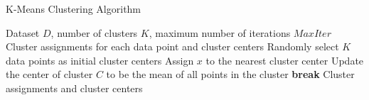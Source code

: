 \documentclass{article}
\begin{document}
	
	\begin{algorithm}
		\caption{K-Means Clustering Algorithm}
		\begin{algorithmic}[1]
			\Require Dataset $D$, number of clusters $K$, maximum number of iterations $MaxIter$
			\Ensure Cluster assignments for each data point and cluster centers
			\State Randomly select $K$ data points as initial cluster centers
			\State Assign $x$ to the nearest cluster center
			\EndFor
			\State Update the center of cluster $C$ to be the mean of all points in the cluster
			\EndFor
			\State \textbf{break}
			\EndIf
			\EndFor
			\State \Return Cluster assignments and cluster centers
		\end{algorithmic}
	\end{algorithm}
	
\end{document}
